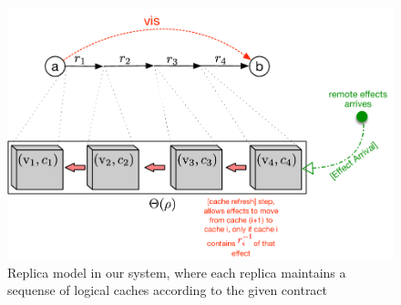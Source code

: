 \begin{figure}[h]
\includegraphics[scale=0.6]{../Figures/Caches.pdf}
\caption{Replica model in our system, where each replica maintains a sequense of logical caches according to the given contract}
\end{figure}

